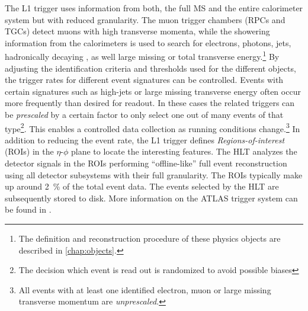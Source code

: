 The L1 trigger uses information from both, the full MS and the entire calorimeter system but with reduced granularity.
The muon trigger chambers (RPCs and TGCs) detect muons with high transverse momenta, while the showering information from the calorimeters is used to search for electrons, photons, jets, hadronically decaying \tauleptons, as well large missing or total transverse energy.\footnote{The definition and reconstruction procedure of these physics objects are described in \cref{chap:objects}.}
By adjusting the identification criteria and thresholds used for the different objects, the trigger rates for different event signatures can be controlled.
Events with certain signatures such as high-\pT jets or large missing transverse energy often occur more frequently than desired for readout. In these cases the related triggers can be \emph{prescaled} by a certain factor to only select one out of many events of that type\footnote{The decision which event is read out is randomized to avoid possible biases}. This enables a controlled data collection as running conditions change.\footnote{All events with at least one identified electron, muon or large missing transverse momentum are \emph{unprescaled}.}
In addition to reducing the event rate, the L1 trigger defines \emph{Regions-of-interest} (ROIs) in the $\eta$-$\phi$ plane to locate the interesting features.
The HLT analyzes the detector signals in the ROIs performing ``offline-like'' full event reconstruction using all detector subsystems with their full granularity. The ROIs typically make up around \SI{2}{\percent} of the total event data.
The events selected by the HLT are subsequently stored to disk.
More information on the ATLAS trigger system can be found in .

